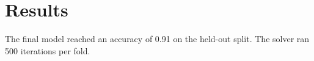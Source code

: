 \section{Results}
The final model reached an accuracy of 0.91 on the held-out split.
The solver ran 500 iterations per fold.
